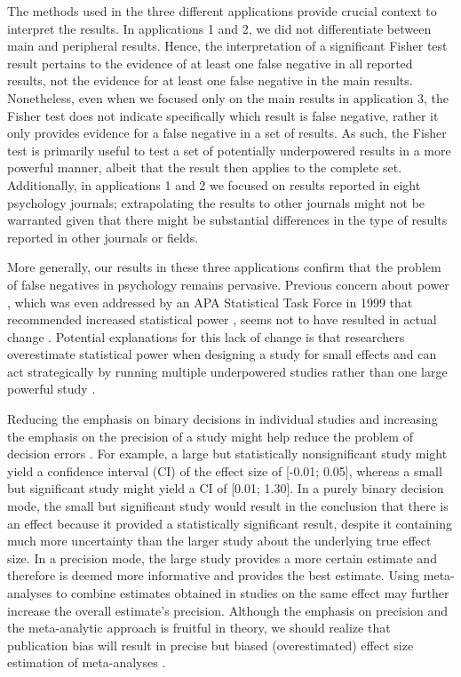 \documentclass{article}
\begin{document}
The methods used in the three different applications provide crucial context to interpret the results. In applications 1 and 2, we did not differentiate between main and peripheral results. Hence, the interpretation of a significant Fisher test result pertains to the evidence of at least one false negative in all reported results, not the evidence for at least one false negative in the main results. Nonetheless, even when we focused only on the main results in application 3, the Fisher test does not indicate specifically which result is false negative, rather it only provides evidence for a false negative in a set of results. As such, the Fisher test is primarily useful to test a set of potentially underpowered results in a more powerful manner, albeit that the result then applies to the complete set. Additionally, in applications 1 and 2 we focused on results reported in eight psychology journals; extrapolating the results to other journals might not be warranted given that there might be substantial differences in the type of results reported in other journals or fields. 

More generally, our results in these three applications confirm that the problem of false negatives in psychology remains pervasive. Previous concern about power \cite{Cohen1962-jc,Sedlmeier1989-yc,Bakker2012-tf,Marszalek2011-rf}, which was even addressed by an APA Statistical Task Force in 1999 that recommended increased statistical power \cite{Wilkinson_APA_Task_Force_on_Statistical_Inference1999-ht}, seems not to have resulted in actual change \cite{Marszalek2011-rf}. Potential explanations for this lack of change is that researchers overestimate statistical power when designing a study for small effects \cite{Bakker2016-nj} and can act strategically by running multiple underpowered studies rather than one large powerful study \cite{Bakker2012-tf}.

Reducing the emphasis on binary decisions in individual studies and increasing the emphasis on the precision of a study might help reduce the problem of decision errors \cite{Cumming2014-fi}. For example, a large but statistically nonsignificant study might yield a confidence interval (CI) of the effect size of [-0.01; 0.05], whereas a small but significant study might yield a CI of [0.01; 1.30]. In a purely binary decision mode, the small but significant study would result in the conclusion that there is an effect because it provided a statistically significant result, despite it containing much more uncertainty than the larger study about the underlying true effect size. In a precision mode, the large study provides a more certain estimate and therefore is deemed more informative and provides the best estimate. Using meta-analyses to combine estimates obtained in studies on the same effect may further increase the overall estimate’s precision. Although the emphasis on precision and the meta-analytic approach is fruitful in theory, we should realize that publication bias will result in precise but biased (overestimated) effect size estimation of meta-analyses \cite{Nuijten2015-kh}.
\end{document}
